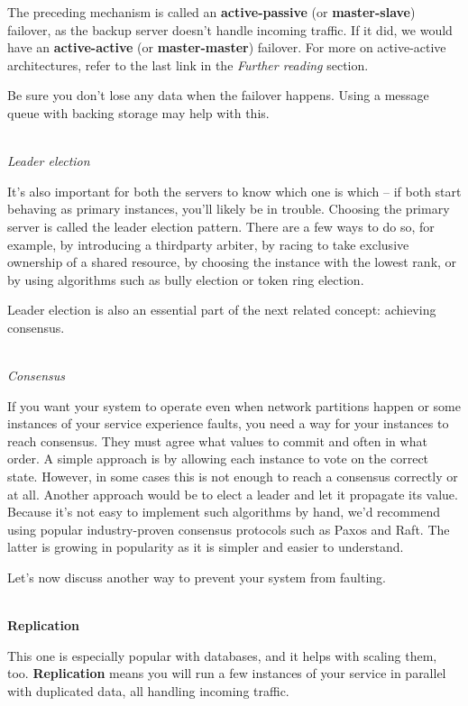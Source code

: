 The preceding mechanism is called an \textbf{active-passive} (or \textbf{master-slave}) failover, as the backup server doesn't handle incoming traffic. If it did, we would have an \textbf{active-active} (or \textbf{master-master}) failover. For more on active-active architectures, refer to the last link in the \textit{Further reading} section.

Be sure you don't lose any data when the failover happens. Using a message queue with backing storage may help with this.


\hspace*{\fill} \\ %
\noindent
\textit{Leader election}

It's also important for both the servers to know which one is which – if both start behaving as primary instances, you'll likely be in trouble. Choosing the primary server is called the leader election pattern. There are a few ways to do so, for example, by introducing a thirdparty arbiter, by racing to take exclusive ownership of a shared resource, by choosing the instance with the lowest rank, or by using algorithms such as bully election or token ring election.

Leader election is also an essential part of the next related concept: achieving consensus.


\hspace*{\fill} \\ %
\noindent
\textit{Consensus}

If you want your system to operate even when network partitions happen or some instances of your service experience faults, you need a way for your instances to reach consensus. They must agree what values to commit and often in what order. A simple approach is by allowing each instance to vote on the correct state. However, in some cases this is not enough to reach a consensus correctly or at all. Another approach would be to elect a leader and let it propagate its value. Because it's not easy to implement such algorithms by hand, we'd recommend using popular industry-proven consensus protocols such as Paxos and Raft. The latter is growing in popularity as it is simpler and easier to understand.

Let's now discuss another way to prevent your system from faulting.


\hspace*{\fill} \\ %
\noindent
\textbf{Replication}

This one is especially popular with databases, and it helps with scaling them, too. \textbf{Replication} means you will run a few instances of your service in parallel with duplicated data, all handling incoming traffic.

